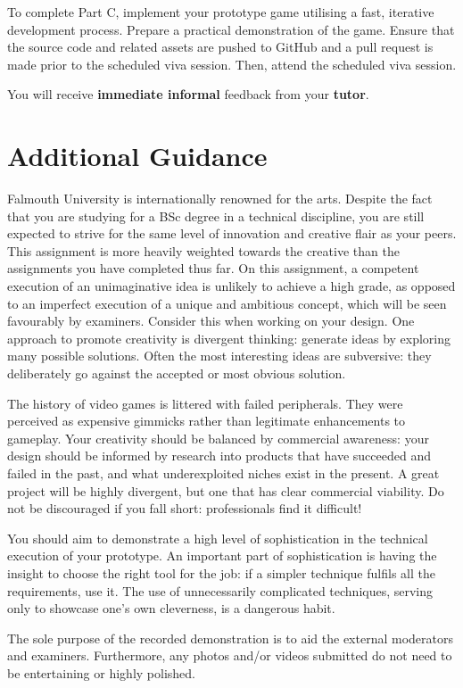 \documentclass{../../fal_assignment}
\begin{document}
	To complete Part C, implement your prototype game utilising a fast, iterative development process. Prepare a practical demonstration of the game. Ensure that the source code and related assets are pushed to GitHub and a pull request is made prior to the scheduled viva session. Then, attend the scheduled viva session. 
	
	You will receive \textbf{immediate informal} feedback from your \textbf{tutor}.
	
	\section*{Additional Guidance}
	Falmouth University is internationally renowned for the arts. Despite the fact that you are studying for a BSc degree in a technical discipline, you are still expected to strive for the same level of innovation and creative flair as your peers. This assignment is more heavily weighted towards the creative than the assignments you have completed thus far. On this assignment, a competent execution of an unimaginative idea is unlikely to achieve a high grade, as opposed to an imperfect execution of a unique and ambitious concept, which will be seen favourably by examiners. Consider this when working on your design. One approach to promote creativity is divergent thinking: generate ideas by exploring many possible solutions. Often the most interesting ideas are subversive: they deliberately go against the accepted or most obvious solution.
	
	The history of video games is littered with failed peripherals. They were perceived as expensive gimmicks rather than legitimate enhancements to gameplay. Your creativity should be balanced by commercial awareness: your design should be informed by research into products that have succeeded and failed in the past, and what underexploited niches exist in the present. A great project will be highly divergent, but one that has clear commercial viability. Do not be discouraged if you fall short: professionals find it difficult! 
	
	You should aim to demonstrate a high level of sophistication in the technical execution of your prototype. An important part of sophistication is having the insight to choose the right tool for the job: if a simpler technique fulfils all the requirements, use it. The use of unnecessarily complicated techniques, serving only to showcase one's own cleverness, is a dangerous habit. 
	
	The sole purpose of the recorded demonstration is to aid the external moderators and examiners. Furthermore, any photos and/or videos submitted do not need to be entertaining or highly polished.
	
\end{document}
